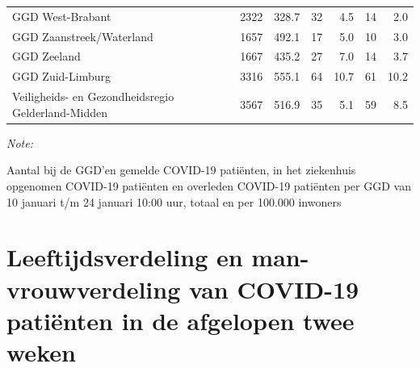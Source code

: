 \documentclass[
  english,
  man,floatsintext]{apa6}
\begin{document}
\begin{table}[H]
\begin{threeparttable}
\begin{tabular}{lrrrrrr}
GGD West-Brabant & 2322 & 328.7 & 32 & 4.5 & 14 & 2.0\\
GGD Zaanstreek/Waterland & 1657 & 492.1 & 17 & 5.0 & 10 & 3.0\\
GGD Zeeland & 1667 & 435.2 & 27 & 7.0 & 14 & 3.7\\
GGD Zuid-Limburg & 3316 & 555.1 & 64 & 10.7 & 61 & 10.2\\
Veiligheids- en Gezondheidsregio Gelderland-Midden & 3567 & 516.9 & 35 & 5.1 & 59 & 8.5\\
\bottomrule
\end{tabular}
\begin{tablenotes}
\item \textit{Note: } 
\item Aantal bij de GGD’en gemelde COVID-19 patiënten, in het ziekenhuis opgenomen COVID-19 patiënten en overleden COVID-19 patiënten per GGD van 10 januari t/m 24 januari 10:00 uur, totaal en per 100.000 inwoners
\end{tablenotes}
\end{threeparttable}
\endgroup{}
\end{table}

\newpage

\hypertarget{leeftijdsverdeling-en-man-vrouwverdeling-van-covid-19-patiuxebnten-in-de-afgelopen-twee-weken}{%
\section{Leeftijdsverdeling en man-vrouwverdeling van COVID-19 patiënten in de afgelopen twee weken}\label{leeftijdsverdeling-en-man-vrouwverdeling-van-covid-19-patiuxebnten-in-de-afgelopen-twee-weken}}
\end{document}
